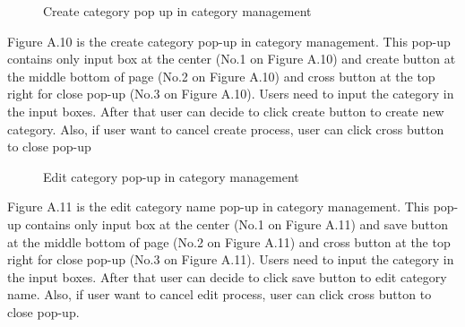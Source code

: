 \documentclass[12pt,oneside,openright,a4paper]{cpe-english-project}
\begin{document}
\begin{figure}[!h]\centering
{}
\caption{Create category pop up in category management}
\label{fig:Create category pop up in category management}
\end{figure}

Figure A.10 is the create category pop-up in category management. This pop-up
contains only input box at the center (No.1 on Figure A.10) and create button at the middle 
bottom of page (No.2 on Figure A.10) and cross button at the top right for close pop-up (No.3 
on Figure A.10).
Users need to input the category in the input boxes. After that user can decide to 
click create button to create new category. Also, if user want to cancel create process, user 
can click cross button to close pop-up

\begin{figure}[!h]\centering
{}
\caption{Edit category pop-up in category management}
\label{fig:Edit category pop-up in category management}
\end{figure}

Figure A.11 is the edit category name pop-up in category management. This pop-up 
contains only input box at the center (No.1 on Figure A.11) and save button at the middle 
bottom of page (No.2 on Figure A.11) and cross button at the top right for close pop-up (No.3
on Figure A.11).
Users need to input the category in the input boxes. After that user can decide to 
click save button to edit category name. Also, if user want to cancel edit process, user can 
click cross button to close pop-up.
\end{document}
